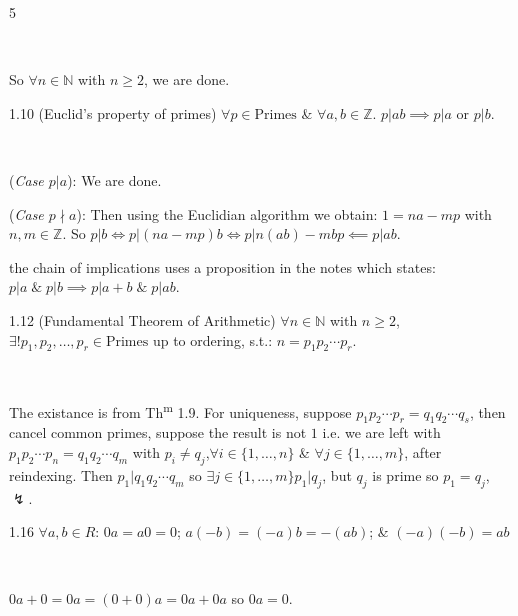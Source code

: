 \documentclass[8pt]{extarticle}
\makeatletter
\renewenvironment{proof}[1][\proofname]{%
  \par\noindent
  \pushQED{\qed}%
  \normalfont\itshape #1\@addpunct{.}\ \normalfont\ignorespaces
}{%
  \popQED%
  \par
}
\makeatother
\begin{document}
\begin{multicols}{5}
\begin{proof}
            So \(\forall n\in\mathbb{N}\) with \(n\ge2\), we are done.

        \end{proof}

        \begin{theorem}{1.10}
            (Euclid's property of primes) \(\forall p\in \text{Primes}\) \& \(\forall a,b\in\mathbb{Z}\). \(p|ab\implies p|a\text{ or } p|b\).
        \end{theorem}

        \begin{proof}
            (\textit{Case \(p|a\)}): We are done.

            (\textit{Case \(p\nmid a\)}): Then using the Euclidian algorithm we obtain: \(1=na-mp\) with \(n,m\in\mathbb{Z}\).
            So \(p|b\Longleftrightarrow p|(na-mp)b\Longleftrightarrow p|n(ab)-mbp\impliedby p|ab\).
        \end{proof}

        {\footnotesize the chain of implications uses a proposition in the notes which states: \(p|a\;\&\;p|b\implies p|a+b\;\&\;p|ab\)}.

        \begin{theorem}{1.12}
            (Fundamental Theorem of Arithmetic) \(\forall n\in\mathbb{N}\) with \(n\ge2\), \(\exists! p_1,p_2,\ldots,p_r\in\text{Primes}\) up to ordering, s.t.: \(n=p_1p_2\cdots p_r\).
        \end{theorem}

        \begin{proof}
            The existance is from Th\textsuperscript{m} 1.9. For uniqueness, suppose \(p_1p_2\cdots p_r=q_1q_2\cdots q_s\), then cancel common primes, suppose the result is not \(1\) i.e. we are left with \(p_1p_2\cdots p_n=q_1q_2\cdots q_m\) with \(p_i\ne q_j\),\(\forall i\in\{1,\ldots,n\}\) \& \(\forall j\in\{1,\ldots,m\}\), after reindexing. Then \(p_1|q_1q_2\cdots q_m\) so \(\exists j\in\{1,\ldots,m\}\)\(p_1|q_j\), but \(q_j\) is prime so \(p_1=q_j\), \(\lightning\).
        \end{proof}

        \begin{lemma}{1.16}
            \(\forall a,b\in R\): \(0a=a0=0\); \(a(-b)=(-a)b=-(ab)\); \& \((-a)(-b)=ab\)
        \end{lemma}

        \begin{proof}
            \(0a+0=0a=(0+0)a=0a+0a\) so \(0a=0\).
            

\end{proof}
\end{multicols}
\end{document}

